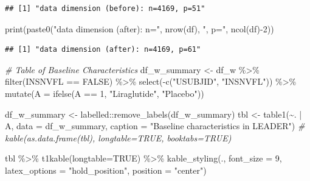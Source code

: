 \documentclass[
]{article}
\newenvironment{Shaded}{\begin{snugshade}}{\end{snugshade}}
\newcommand{\AttributeTok}[1]{\textcolor[rgb]{0.77,0.63,0.00}{#1}}
\newcommand{\CommentTok}[1]{\textcolor[rgb]{0.56,0.35,0.01}{\textit{#1}}}
\newcommand{\ConstantTok}[1]{\textcolor[rgb]{0.00,0.00,0.00}{#1}}
\newcommand{\DecValTok}[1]{\textcolor[rgb]{0.00,0.00,0.81}{#1}}
\newcommand{\FunctionTok}[1]{\textcolor[rgb]{0.00,0.00,0.00}{#1}}
\newcommand{\NormalTok}[1]{#1}
\newcommand{\OtherTok}[1]{\textcolor[rgb]{0.56,0.35,0.01}{#1}}
\newcommand{\SpecialCharTok}[1]{\textcolor[rgb]{0.00,0.00,0.00}{#1}}
\newcommand{\StringTok}[1]{\textcolor[rgb]{0.31,0.60,0.02}{#1}}
\begin{document}
\begin{verbatim}
## [1] "data dimension (before): n=4169, p=51"
\end{verbatim}

\begin{Shaded}
\begin{Highlighting}[]
\FunctionTok{print}\NormalTok{(}\FunctionTok{paste0}\NormalTok{(}\StringTok{"data dimension (after): n="}\NormalTok{, }\FunctionTok{nrow}\NormalTok{(df), }\StringTok{", p="}\NormalTok{, }\FunctionTok{ncol}\NormalTok{(df)}\SpecialCharTok{{-}}\DecValTok{2}\NormalTok{))}
\end{Highlighting}
\end{Shaded}

\begin{verbatim}
## [1] "data dimension (after): n=4169, p=61"
\end{verbatim}

\begin{Shaded}
\begin{Highlighting}[]
\CommentTok{\# Table of Baseline Characteristics }
\NormalTok{df\_w\_summary }\OtherTok{\textless{}{-}}\NormalTok{ df\_w }\SpecialCharTok{\%\textgreater{}\%} 
  \FunctionTok{filter}\NormalTok{(INSNVFL }\SpecialCharTok{==} \ConstantTok{FALSE}\NormalTok{) }\SpecialCharTok{\%\textgreater{}\%} 
  \FunctionTok{select}\NormalTok{(}\SpecialCharTok{{-}}\FunctionTok{c}\NormalTok{(}\StringTok{"USUBJID"}\NormalTok{, }\StringTok{"INSNVFL"}\NormalTok{)) }\SpecialCharTok{\%\textgreater{}\%} 
  \FunctionTok{mutate}\NormalTok{(}\AttributeTok{A =} \FunctionTok{ifelse}\NormalTok{(A }\SpecialCharTok{==} \DecValTok{1}\NormalTok{, }\StringTok{"Liraglutide"}\NormalTok{, }\StringTok{"Placebo"}\NormalTok{))}

\NormalTok{df\_w\_summary }\OtherTok{\textless{}{-}}\NormalTok{ labelled}\SpecialCharTok{::}\FunctionTok{remove\_labels}\NormalTok{(df\_w\_summary)}
\NormalTok{tbl }\OtherTok{\textless{}{-}} \FunctionTok{table1}\NormalTok{(}\SpecialCharTok{\textasciitilde{}}\NormalTok{. }\SpecialCharTok{|}\NormalTok{ A, }\AttributeTok{data =}\NormalTok{ df\_w\_summary, }\AttributeTok{caption =} \StringTok{"Baseline characteristics in LEADER"}\NormalTok{)}
\CommentTok{\# kable(as.data.frame(tbl), longtable=TRUE, booktabs=TRUE) }
\end{Highlighting}
\end{Shaded}

\newpage

\begin{Shaded}
\begin{Highlighting}[]
\NormalTok{tbl }\SpecialCharTok{\%\textgreater{}\%} \FunctionTok{t1kable}\NormalTok{(}\AttributeTok{longtable=}\ConstantTok{TRUE}\NormalTok{) }\SpecialCharTok{\%\textgreater{}\%}
  \FunctionTok{kable\_styling}\NormalTok{(., }\AttributeTok{font\_size =} \DecValTok{9}\NormalTok{, }\AttributeTok{latex\_options =} \StringTok{"hold\_position"}\NormalTok{, }\AttributeTok{position =} \StringTok{"center"}\NormalTok{)}
\end{Highlighting}
\end{Shaded}
\end{document}
